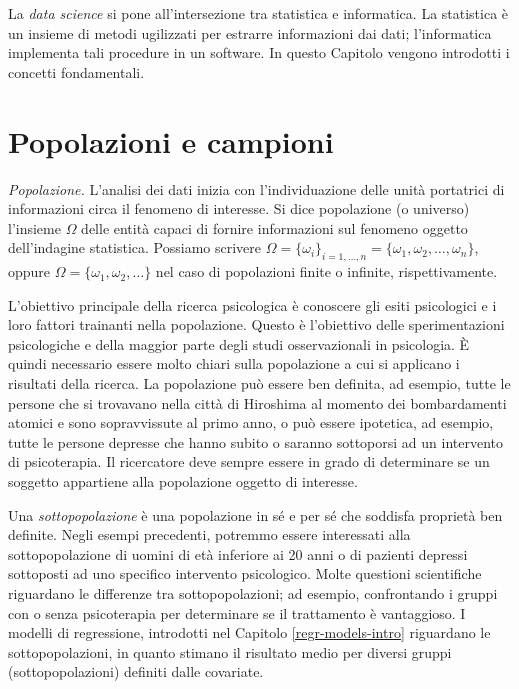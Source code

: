\documentclass[
  11pt,
]{krantz}
\theoremstyle{definition}
\theoremstyle{definition}
\theoremstyle{definition}
\theoremstyle{definition}
\theoremstyle{remark}
\begin{document}
La \emph{data science} si pone all'intersezione tra statistica e informatica. La statistica è un insieme di metodi ugilizzati per estrarre informazioni dai dati; l'informatica implementa tali procedure in un software. In questo Capitolo vengono introdotti i concetti fondamentali.

\hypertarget{popolazioni-e-campioni}{%
\section{Popolazioni e campioni}\label{popolazioni-e-campioni}}

\emph{Popolazione.} L'analisi dei dati inizia con l'individuazione delle unità portatrici di informazioni circa il fenomeno di interesse. Si dice popolazione (o universo) l'insieme \(\Omega\) delle entità capaci di fornire informazioni sul fenomeno oggetto dell'indagine statistica. Possiamo scrivere \(\Omega = \{\omega_i\}_{i=1, \dots, n}= \{\omega_1, \omega_2, \dots, \omega_n\}\), oppure \(\Omega = \{\omega_1, \omega_2, \dots \}\) nel caso di popolazioni finite o infinite, rispettivamente.

L'obiettivo principale della ricerca psicologica è conoscere gli esiti psicologici e i loro fattori trainanti nella popolazione. Questo è l'obiettivo delle sperimentazioni psicologiche e della maggior parte degli studi osservazionali in psicologia. È quindi necessario essere molto chiari sulla popolazione a cui si applicano i risultati della ricerca. La popolazione può essere ben definita, ad esempio, tutte le persone che si trovavano nella città di Hiroshima al momento dei bombardamenti atomici e sono sopravvissute al primo anno, o può essere ipotetica, ad esempio, tutte le persone depresse che hanno subito o saranno sottoporsi ad un intervento di psicoterapia. Il ricercatore deve sempre essere in grado di determinare se un soggetto appartiene alla popolazione oggetto di interesse.

Una \emph{sottopopolazione} è una popolazione in sé e per sé che soddisfa proprietà ben definite. Negli esempi precedenti, potremmo essere interessati alla sottopopolazione di uomini di età inferiore ai 20 anni o di pazienti depressi sottoposti ad uno specifico intervento psicologico. Molte questioni scientifiche riguardano le differenze tra sottopopolazioni; ad esempio, confrontando i gruppi con o senza psicoterapia per determinare se il trattamento è vantaggioso. I modelli di regressione, introdotti nel Capitolo \ref{regr-models-intro} riguardano le sottopopolazioni, in quanto stimano il risultato medio per diversi gruppi (sottopopolazioni) definiti dalle covariate.
\end{document}
